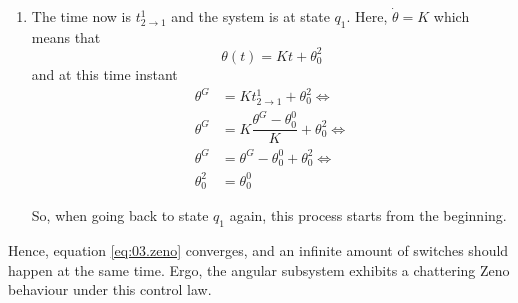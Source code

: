\begin{enumerate}
    \item The time now is $t_{2\rightarrow1}^1$ and the system is at state $q_1$.
      Here, $\dot{\theta} = K$ which means that
      $$\theta(t) = K t + \theta_0^2$$
      and at this time instant
      \begin{align*}
        \theta^G &= K t_{2\rightarrow1}^1 + \theta_0^2 \Leftrightarrow \\
        \theta^G &= K \dfrac{\theta^G - \theta_0^0}{K} + \theta_0^2 \Leftrightarrow \\
        \theta^G &= \theta^G - \theta_0^0 + \theta_0^2 \Leftrightarrow \\
        \theta_0^2 &= \theta_0^0
      \end{align*}

      So, when going back to state $q_1$ again, this process starts from
      the beginning.
\end{enumerate}

Hence, equation \ref{eq:03.zeno} converges, and an infinite amount of switches
should happen at the same time. Ergo, the angular subsystem exhibits a chattering
Zeno behaviour under this control law.


\begin{figure}[H]\centering
  \scalebox{0.9}{}
  \caption{}
  \label{fig:03}
\end{figure}
